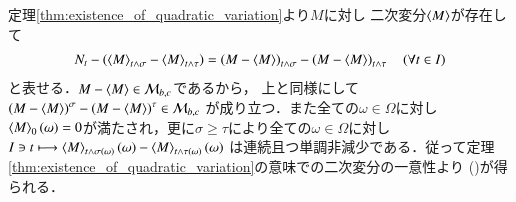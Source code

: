 \begin{prf}
\begin{description}
				定理\ref{thm:existence_of_quadratic_variation}より$M$に対し
				二次変分$\inprod<M>$が存在して
				\begin{align}
					N_t - \left( \inprod<M>_{t \wedge \sigma} - \inprod<M>_{t \wedge \tau} \right)
					= \left( M - \inprod<M> \right)_{t \wedge \sigma} - \left( M - \inprod<M> \right)_{t \wedge \tau}
					\quad (\forall t \in I)
				\end{align}
				と表せる．$M - \inprod<M> \in \mathcal{M}_{b,c}$であるから，
				上と同様にして$\left( M - \inprod<M> \right)^\sigma - \left( M - \inprod<M> \right)^\tau \in \mathcal{M}_{b,c}$
				が成り立つ．また全ての$\omega \in \Omega$に対し
				$\inprod<M>_0(\omega) = 0$が満たされ，更に$\sigma \geq \tau$により全ての$\omega \in \Omega$に対し
				$I \ni t \longmapsto \inprod<M>_{t \wedge \sigma(\omega)}(\omega) - \inprod<M>_{t \wedge \tau(\omega)}(\omega)$
				は連続且つ単調非減少である．従って定理\ref{thm:existence_of_quadratic_variation}の意味での二次変分の一意性より
				()が得られる．
				

\end{description}
\end{prf}
